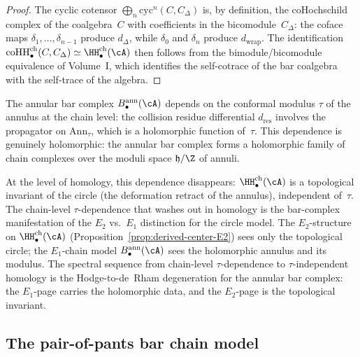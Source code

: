 \begin{proof}
The cyclic cotensor
$\bigoplus_n\mathrm{cyc}^n(C,C_\Delta)$ is, by
definition, the coHochschild complex of the coalgebra~$C$
with coefficients in the bicomodule~$C_\Delta$: the coface
maps $\delta_1,\ldots,\delta_{n-1}$ produce $d_\Delta$,
while $\delta_0$ and $\delta_n$ produce $d_{\mathrm{wrap}}$.
The identification
$\operatorname{coHH}^{\mathrm{ch}}_\bullet(C,C_\Delta)
\simeq\HH^{\mathrm{ch}}_\bullet(\cA)$ then follows from
the bimodule/bicomodule equivalence of
Volume~I, which identifies the self-cotrace of the bar
coalgebra with the self-trace of the algebra.
\end{proof}

\begin{remark}%
\label{rem:annular-modulus-dependence}%
%
%
The annular bar complex $B^{\mathrm{ann}}_\bullet(\cA)$
depends on the conformal modulus $\tau$ of the annulus at
the chain level: the collision residue differential
$d_{\mathrm{res}}$ involves the propagator on $\mathrm{Ann}_\tau$,
which is a holomorphic function of~$\tau$. This dependence
is genuinely holomorphic: the annular bar complex forms a
holomorphic family of chain complexes over the moduli space
$\mathfrak{h}/\Z$ of annuli.

At the level of homology, this dependence disappears:
$\HH^{\mathrm{ch}}_\bullet(\cA)$ is a topological invariant
of the circle (the deformation retract of the annulus),
independent of~$\tau$. The chain-level $\tau$-dependence that
washes out in homology is the bar-complex manifestation of the
$E_2$ vs.\ $E_1$ distinction for the circle model. The
$E_2$-structure on
$\HH^{\mathrm{ch}}_\bullet(\cA)$
\textup{(}Proposition~\textup{\ref{prop:derived-center-E2}}\textup{)}
sees only the topological circle; the $E_1$-chain model
$B^{\mathrm{ann}}_\bullet(\cA)$ sees the holomorphic annulus
and its modulus. The spectral sequence from chain-level
$\tau$-dependence to $\tau$-independent homology is the
Hodge-to-de~Rham degeneration for the annular bar complex:
the $E_1$-page carries the holomorphic data, and the
$E_2$-page is the topological invariant.
\end{remark}

\subsection{The pair-of-pants bar chain model}
\label{subsec:pants-bar-chain-model}

